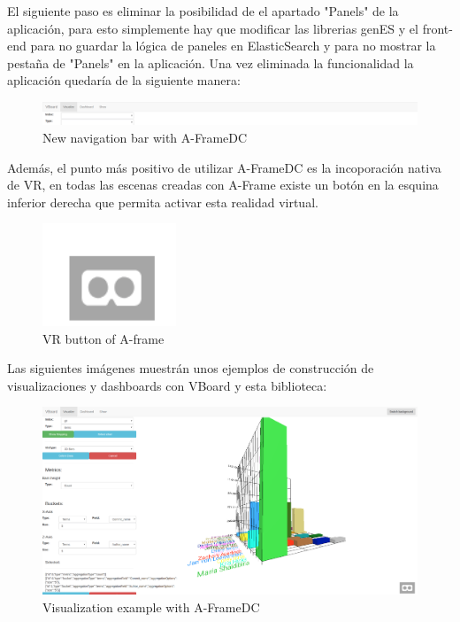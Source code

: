 \documentclass[a4paper, 12pt]{book}
\begin{document}
El siguiente paso es eliminar la posibilidad de  el apartado "Panels" de la aplicación, para esto simplemente hay que modificar las librerias genES y el front-end para no guardar la lógica de paneles en ElasticSearch y para no mostrar la pestaña de "Panels" en la aplicación. Una vez eliminada la funcionalidad la aplicación quedaría de la siguiente manera:

\begin{figure}[H]
  \centering
  \includegraphics[width=16cm, keepaspectratio]{img/development/newnavbar}
  \caption{New navigation bar with A-FrameDC}
  \label{fig:examplestandalone}
\end{figure}

Además, el punto más positivo de utilizar A-FrameDC es la incoporación nativa de VR, en todas las escenas creadas con A-Frame existe un botón en la esquina inferior derecha que permita activar esta realidad virtual.

\begin{figure}[H]
  \centering
  \includegraphics[width=4cm, keepaspectratio]{img/development/vrbutton}
  \caption{VR button of A-frame}
  \label{fig:examplestandalone}
\end{figure}

Las siguientes imágenes muestrán unos ejemplos de construcción de visualizaciones y dashboards con VBoard y esta biblioteca:

\begin{figure}[H]
  \centering
  \includegraphics[width=16cm, keepaspectratio]{img/development/examplevisaframedc}
  \caption{Visualization example with A-FrameDC}
  \label{fig:examplestandalone}
\end{figure}
\end{document}
